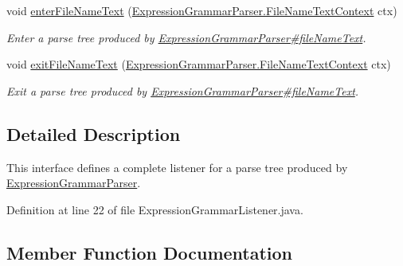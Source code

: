 \begin{DoxyCompactItemize}
void \hyperlink{interfacegov_1_1nasa_1_1jpf_1_1inspector_1_1server_1_1expression_1_1parser_1_1_expression_grammar_listener_a0e6e8c0716cb53e0416756444b1e9851}{enter\+File\+Name\+Text} (\hyperlink{classgov_1_1nasa_1_1jpf_1_1inspector_1_1server_1_1expression_1_1parser_1_1_expression_grammar_parser_1_1_file_name_text_context}{Expression\+Grammar\+Parser.\+File\+Name\+Text\+Context} ctx)
\begin{DoxyCompactList}\small\item\em Enter a parse tree produced by \hyperlink{classgov_1_1nasa_1_1jpf_1_1inspector_1_1server_1_1expression_1_1parser_1_1_expression_grammar_parser_a8cd683a15c48a56f1a8fbcaed2a4b049}{Expression\+Grammar\+Parser\#file\+Name\+Text}. \end{DoxyCompactList}\item 
void \hyperlink{interfacegov_1_1nasa_1_1jpf_1_1inspector_1_1server_1_1expression_1_1parser_1_1_expression_grammar_listener_aec09101ad49b0cb06e45ca4893f4457f}{exit\+File\+Name\+Text} (\hyperlink{classgov_1_1nasa_1_1jpf_1_1inspector_1_1server_1_1expression_1_1parser_1_1_expression_grammar_parser_1_1_file_name_text_context}{Expression\+Grammar\+Parser.\+File\+Name\+Text\+Context} ctx)
\begin{DoxyCompactList}\small\item\em Exit a parse tree produced by \hyperlink{classgov_1_1nasa_1_1jpf_1_1inspector_1_1server_1_1expression_1_1parser_1_1_expression_grammar_parser_a8cd683a15c48a56f1a8fbcaed2a4b049}{Expression\+Grammar\+Parser\#file\+Name\+Text}. \end{DoxyCompactList}\end{DoxyCompactItemize}


\subsection{Detailed Description}
This interface defines a complete listener for a parse tree produced by \hyperlink{classgov_1_1nasa_1_1jpf_1_1inspector_1_1server_1_1expression_1_1parser_1_1_expression_grammar_parser}{Expression\+Grammar\+Parser}. 

Definition at line 22 of file Expression\+Grammar\+Listener.\+java.



\subsection{Member Function Documentation}
